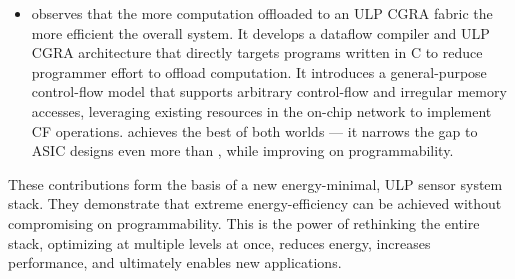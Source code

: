 \begin{itemize}
\item \riptide observes that the more computation offloaded to an ULP CGRA fabric the more efficient the overall system.
% 
It develops a dataflow compiler and ULP CGRA architecture that directly targets programs written in C to reduce programmer effort to offload computation.
% 
It introduces a general-purpose control-flow model that supports arbitrary control-flow and irregular memory accesses, leveraging existing resources in the on-chip network to implement CF operations.
% 
\riptide achieves the best of both worlds --- it narrows the gap to ASIC designs even more than \snafu, while improving on programmability.
\end{itemize}

These contributions form the basis of a new energy-minimal, ULP sensor system stack.
% 
They demonstrate that extreme energy-efficiency can be achieved without compromising on programmability.
%
This is the power of rethinking the entire stack, optimizing at multiple levels at once, reduces energy, increases performance, and ultimately enables new applications.
